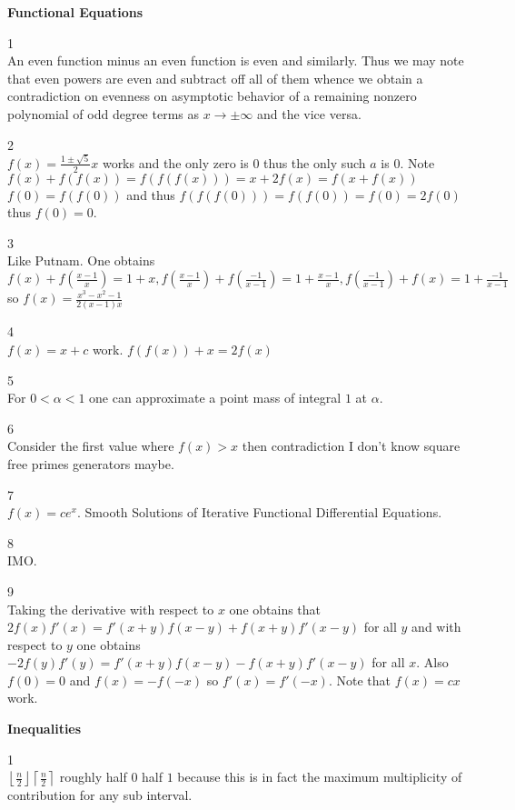 \newpage

\textbf{Functional Equations}

1 \\
An even function minus an even function is even and similarly. Thus we may note that even powers are even and subtract off all of them whence we obtain a contradiction on evenness on asymptotic behavior of a remaining nonzero polynomial of odd degree terms as $x \to \pm \infty$ and the vice versa.

2 \\
$f(x)=\frac{1\pm\sqrt{5}}{2}x$ works and the only zero is $0$ thus the only such $a$ is $0$. Note $f(x)+f(f(x))=f(f(f(x)))=x+2f(x)=f(x+f(x))$ $f(0)=f(f(0))$ and thus $f(f(f(0)))=f(f(0))=f(0)=2f(0)$ thus $f(0)=0$.

3 \\
Like Putnam. One obtains $f(x)+f\left(\frac{x-1}{x}\right)=1+x,f\left(\frac{x-1}{x}\right)+f\left(\frac{-1}{x-1}\right)=1+\frac{x-1}{x},f\left(\frac{-1}{x-1}\right)+f(x)=1+\frac{-1}{x-1}$ so $\boxed{f(x)=\frac{x^3-x^2-1}{2(x-1)x}}$

4 \\
$\boxed{f(x)=x+c}$ work. $f(f(x))+x=2f(x)$

5 \\
For $0<\alpha<1$ one can approximate a point mass of integral $1$ at $\alpha$.

6 \\
Consider the first value where $f(x)>x$ then contradiction I don't know square free primes generators maybe.

7 \\
$\boxed{f(x)=ce^x}$. Smooth Solutions of Iterative Functional Differential Equations.

8 \\
IMO.

9 \\
Taking the derivative with respect to $x$ one obtains that $2f(x)f'(x)=f'(x+y)f(x-y)+f(x+y)f'(x-y)$ for all $y$ and with respect to $y$ one obtains $-2f(y)f'(y)=f'(x+y)f(x-y)-f(x+y)f'(x-y)$ for all $x$. Also $f(0)=0$ and $f(x)=-f(-x)$ so $f'(x)=f'(-x)$. Note that $f(x)=cx$ work.

\newpage

\textbf{Inequalities}

1 \\
$\boxed{\left \lfloor \frac{n}{2} \right \rfloor \left \lceil \frac{n}{2} \right \rceil}$ roughly half $0$ half $1$ because this is in fact the maximum multiplicity of contribution for any sub interval.

